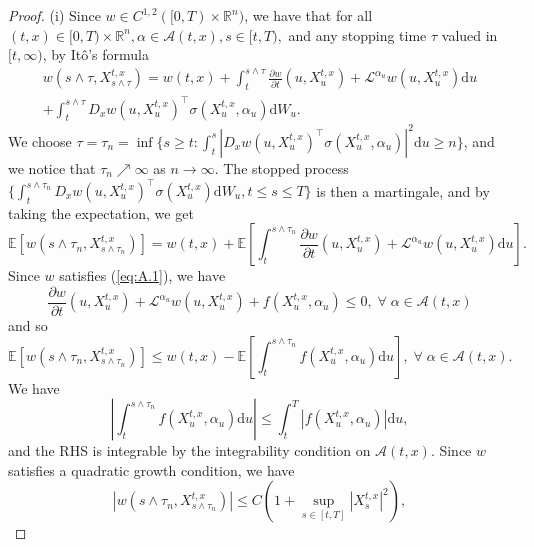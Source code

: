 \begin{proof}
    (i) Since $w\in C^{1,2}([0,T)\times\mathbb{R}^n)$, we have that for all $(t,x)
    \in[0,T)\times\mathbb{R}^n,\alpha\in\mathcal{A}(t,x),s\in[t,T),$ and any stopping
    time $\tau$ valued in $[t,\infty)$, by It\^{o}'s formula
    \begin{multline*}
        w(s\wedge\tau,X_{s\wedge\tau}^{t,x})=w(t,x)+\int_t^{s\wedge\tau}\frac{\partial w}{\partial t}(u,X_u^{t,x})+\mathcal{L}^{\alpha_u}w(u,X_u^{t,x})\mathrm du\\
        +\int_t^{s\wedge\tau}D_xw(u,X_u^{t,x})^\top\sigma(X_u^{t,x},\alpha_u)\mathrm dW_u.
    \end{multline*}
    We choose $\tau=\tau_n=\inf\{s\geq t:\int_t^s|D_xw(u,X_u^{t,x})^\top\sigma(X_u^{t,x},\alpha_u)|^2\mathrm du\geq n\}$,
    and we notice that $\tau_n\nearrow\infty$ as $n\rightarrow\infty$.
    The stopped process $\{\int_t^{s\wedge\tau_n}D_xw(u,X_u^{t,x})^\top\sigma(X_u^{t,x})\mathrm dW_u,t\leq s\leq T\}$
    is then a martingale, and by taking the expectation, we get 
    \begin{equation*}
        \mathbb{E}[w(s\wedge\tau_n,X_{s\wedge\tau_n}^{t,x})]=w(t,x)+\mathbb{E}\left[\int_t^{s\wedge\tau_n}\frac{\partial w}{\partial t}(u,X_u^{t,x})+\mathcal{L}^{\alpha_u}w(u,X_u^{t,x})\mathrm du\right].
    \end{equation*}
    Since $w$ satisfies (\ref{eq:A.1}), we have
    \begin{equation*}
        \frac{\partial w}{\partial t}(u,X_u^{t,x})+\mathcal{L}^{\alpha_u}w(u,X_u^{t,x})+f(X_u^{t,x},\alpha_u)\leq0,\;\forall\;\alpha\in\mathcal{A}(t,x)
    \end{equation*}
    and so
    \begin{equation}\label{eq:A.4}
        \mathbb{E}[w(s\wedge\tau_n,X_{s\wedge\tau_n}^{t,x})]\leq w(t,x)-\mathbb{E}\left[\int_t^{s\wedge\tau_n}f(X_u^{t,x},\alpha_u)\mathrm du\right],\;\forall\;\alpha\in\mathcal{A}(t,x).
    \end{equation}
    We have 
    \begin{equation*}
        \left|\int_t^{s\wedge\tau_n}f(X_u^{t,x},\alpha_u)\mathrm du\right|\leq\int_t^T|f(X_u^{t,x},\alpha_u)|\mathrm du,
    \end{equation*}
    and the RHS is integrable by the integrability condition on $\mathcal{A}(t,x)$.
    Since $w$ satisfies a quadratic growth condition, we have 
    \begin{equation*}
        |w(s\wedge\tau_n,X_{s\wedge\tau_n}^{t,x})|\leq C(1+\sup_{s\in[t,T]}|X_s^{t,x}|^2),

\end{equation*}
\end{proof}
